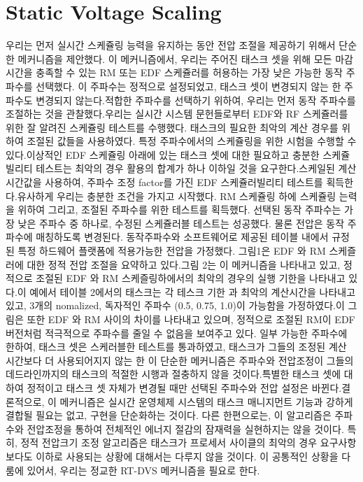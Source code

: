\documentclass[11pt
  , a4paper
  , article
  , oneside
]{memoir}
\begin{document}
\section{Static Voltage Scaling}
우리는 먼저 실시간 스케쥴링 능력을 유지하는 동안 전압 조절을 제공하기 위해서 단순한 메커니즘을 제안했다. 이 메커니즘에서, 우리는 주어진 태스크 셋을 위해 모든 마감시간을 충족할 수 있는 RM 또는 EDF 스케쥴러를 허용하는 가장 낮은 가능한 동작 주파수를 선택했다. 이 주파수는 정적으로 설정되었고, 태스크 셋이 변경되지 않는 한 주파수도 변경되지 않는다.적합한 주파수를 선택하기 위하여, 우리는 먼저 동작 주파수를 조절하는 것을 관찰했다.우리는 실시간 시스템 문헌들로부터 EDF와 RF 스케쥴러를 위한 잘 알려진 스케쥴링 테스트를 수행했다. 태스크의 필요한 최악의 계산 경우를 위하여 조절된 값들을 사용하였다. 특정 주파수에서의 스케쥴링을 위한 시험을 수행할 수 있다.이상적인 EDF 스케쥴링 아래에 있는 태스크 셋에 대한 필요하고 충분한 스케쥴빌리티 테스트는 최악의 경우 활용의 합계가 하나 이하일 것을 요구한다.스케일된 계산 시간값을 사용하여, 주파수 조정 factor를 가진 EDF 스케쥴러빌리티 테스트를 획득한다.유사하게 우리는 충분한 조건을 가지고 시작했다. RM 스케쥴링 하에 스케쥴링 는력을 위하여 
그리고, 조절된 주파수를 위한 테스트를 획득했다. 선택된 동작 주파수는 가장 낮은 주파수 중 하나로, 수정된 스케쥴러블 테스트는 성공했다. 물론 전압은 동작 주파수에 매칭하도록 변경된다. 동작주파수와 소프트웨어로 제공된 테이블 내에서 규정된 특정 하드웨어 플랫폼에 적용가능한 전압을 가정했다. 그림1은 EDF 와 RM 스케즐러에 대한 정적 전압 조절을 요약하고 있다.그림 2는 이 메커니즘을 나타내고 있고, 정적으로 조절된 EDF 와 RM 스케즐링하에서의 최악의 경우의 실행 기한을 나타내고 있다.이 예에서 테이블 2에서의 태스크는 각 테스크 기한 과 최악의 계산시간을 나타내고 있고, 3개의 nomalized, 독자적인 주파수 (0.5, 0.75, 1.0)이 가능함을 가정하였다.이 그림은 또한 EDF 와 RM 사이의 차이를 나타내고 있으며, 정적으로 조절된 RM이 EDF 버전처럼 적극적으로 주파수를 줄일 수 없음을 보여주고 있다. 일부 가능한 주파수에 한하여, 태스크 셋은 스케러블한 테스트를 통과하였고, 태스크가 그들의 조정된 계산 시간보다 더 사용되어지지 않는 한 이 단순한 메커니즘은 주파수와 전압조정이 그들의 데드라인까지의 태스크의 적절한 시행과 절충하지 않을 것이다.특별한 태스크 셋에 대하여 정적이고 태스크 셋 자체가 변경될 때만 선택된 주파수와 전압 설정은 바뀐다.결론적으로, 이 메커니즘은 실시간 운영체제 시스템의 태스크 매니지먼트 기능과 강하게 결합될 필요는 없고, 구현을 단순화하는 것이다. 다른 한편으로는, 이 알고리즘은 주파수와 전압조정을 통하여 전체적인 에너지 절감의 잠재력을 실현하지는 않을 것이다. 특히, 정적 전압크기 조정 알고리즘은  태스크가 프로세서 사이클의 최악의 경우 요구사항 보다도 이하로 사용되는 상황에 대해서는 다루지 않을 것이다. 이 공통적인 상황을 다룸에 있어서, 우리는 정교한 RT-DVS 메커니즘을 필요로 한다.           
\end{document}
